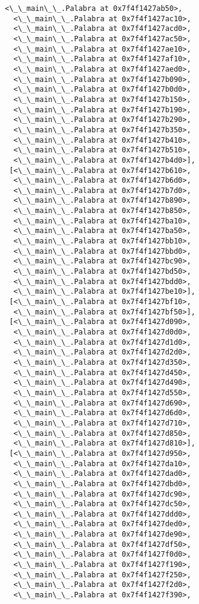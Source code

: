 \documentclass[12pt,a4paper,table]{article}
\begin{document}
\begin{tcolorbox}[breakable, size=fbox, boxrule=.5pt, pad at break*=1mm, opacityfill=0]
\begin{Verbatim}[commandchars=\\\{\}]
  <\_\_main\_\_.Palabra at 0x7f4f1427ab50>,
  <\_\_main\_\_.Palabra at 0x7f4f1427ac10>,
  <\_\_main\_\_.Palabra at 0x7f4f1427acd0>,
  <\_\_main\_\_.Palabra at 0x7f4f1427ac50>,
  <\_\_main\_\_.Palabra at 0x7f4f1427ae10>,
  <\_\_main\_\_.Palabra at 0x7f4f1427af10>,
  <\_\_main\_\_.Palabra at 0x7f4f1427aed0>,
  <\_\_main\_\_.Palabra at 0x7f4f1427b090>,
  <\_\_main\_\_.Palabra at 0x7f4f1427b0d0>,
  <\_\_main\_\_.Palabra at 0x7f4f1427b150>,
  <\_\_main\_\_.Palabra at 0x7f4f1427b190>,
  <\_\_main\_\_.Palabra at 0x7f4f1427b290>,
  <\_\_main\_\_.Palabra at 0x7f4f1427b350>,
  <\_\_main\_\_.Palabra at 0x7f4f1427b410>,
  <\_\_main\_\_.Palabra at 0x7f4f1427b510>,
  <\_\_main\_\_.Palabra at 0x7f4f1427b4d0>],
 [<\_\_main\_\_.Palabra at 0x7f4f1427b610>,
  <\_\_main\_\_.Palabra at 0x7f4f1427b6d0>,
  <\_\_main\_\_.Palabra at 0x7f4f1427b7d0>,
  <\_\_main\_\_.Palabra at 0x7f4f1427b890>,
  <\_\_main\_\_.Palabra at 0x7f4f1427b850>,
  <\_\_main\_\_.Palabra at 0x7f4f1427ba10>,
  <\_\_main\_\_.Palabra at 0x7f4f1427ba50>,
  <\_\_main\_\_.Palabra at 0x7f4f1427bb10>,
  <\_\_main\_\_.Palabra at 0x7f4f1427bbd0>,
  <\_\_main\_\_.Palabra at 0x7f4f1427bc90>,
  <\_\_main\_\_.Palabra at 0x7f4f1427bd50>,
  <\_\_main\_\_.Palabra at 0x7f4f1427bdd0>,
  <\_\_main\_\_.Palabra at 0x7f4f1427be10>],
 [<\_\_main\_\_.Palabra at 0x7f4f1427bf10>,
  <\_\_main\_\_.Palabra at 0x7f4f1427bf50>],
 [<\_\_main\_\_.Palabra at 0x7f4f1427d090>,
  <\_\_main\_\_.Palabra at 0x7f4f1427d0d0>,
  <\_\_main\_\_.Palabra at 0x7f4f1427d1d0>,
  <\_\_main\_\_.Palabra at 0x7f4f1427d2d0>,
  <\_\_main\_\_.Palabra at 0x7f4f1427d350>,
  <\_\_main\_\_.Palabra at 0x7f4f1427d450>,
  <\_\_main\_\_.Palabra at 0x7f4f1427d490>,
  <\_\_main\_\_.Palabra at 0x7f4f1427d550>,
  <\_\_main\_\_.Palabra at 0x7f4f1427d690>,
  <\_\_main\_\_.Palabra at 0x7f4f1427d6d0>,
  <\_\_main\_\_.Palabra at 0x7f4f1427d710>,
  <\_\_main\_\_.Palabra at 0x7f4f1427d850>,
  <\_\_main\_\_.Palabra at 0x7f4f1427d810>],
 [<\_\_main\_\_.Palabra at 0x7f4f1427d950>,
  <\_\_main\_\_.Palabra at 0x7f4f1427da10>,
  <\_\_main\_\_.Palabra at 0x7f4f1427dad0>,
  <\_\_main\_\_.Palabra at 0x7f4f1427dbd0>,
  <\_\_main\_\_.Palabra at 0x7f4f1427dc90>,
  <\_\_main\_\_.Palabra at 0x7f4f1427dc50>,
  <\_\_main\_\_.Palabra at 0x7f4f1427ddd0>,
  <\_\_main\_\_.Palabra at 0x7f4f1427ded0>,
  <\_\_main\_\_.Palabra at 0x7f4f1427de90>,
  <\_\_main\_\_.Palabra at 0x7f4f1427df50>,
  <\_\_main\_\_.Palabra at 0x7f4f1427f0d0>,
  <\_\_main\_\_.Palabra at 0x7f4f1427f190>,
  <\_\_main\_\_.Palabra at 0x7f4f1427f250>,
  <\_\_main\_\_.Palabra at 0x7f4f1427f2d0>,
  <\_\_main\_\_.Palabra at 0x7f4f1427f390>,

\end{Verbatim}
\end{tcolorbox}
\end{document}
